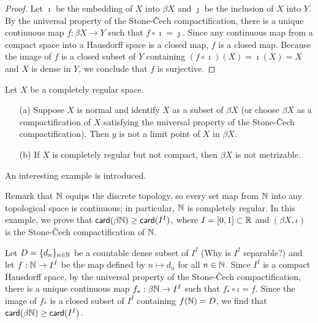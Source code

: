 \begin{proof}
    Let $\imath$ be the embedding of $X$ into $\beta X$ and $\jmath$ be the inclusion of $X$ into $Y$.
    By the universal property of the Stone-\v{C}ech compactification, there is a unique continuous map $f: \beta X\rightarrow Y$ such that $f\circ\imath=\jmath$.
    Since any continuous map from a compact space into a Hausdorff space is a closed map, $f$ is a closed map.
    Because the image of $f$ is a closed subset of $Y$ containing $(f\circ\imath)(X)=\imath(X)=X$ and $X$ is dense in $Y$, we conclude that $f$ is surjective.
\end{proof}
\color{red}
\begin{prop}
    Let $X$ be a completely regular space.
    \begin{enumerate}
        \item[(a)]
        {
            Suppose $X$ is normal and identify $X$ as a subset of $\beta X$ (or choose $\beta X$ as a compactification of $X$ satisfying the universal property of the Stone-\v{C}ech compactification).
            Then $y$ is not a limit point of $X$ in $\beta X$.
        }
        \item[(b)]
        {
            If $X$ is completely regular but not compact, then $\beta X$ is not metrizable.
        }
    \end{enumerate}
\end{prop}
\color{black}

An interesting example is introduced.
\begin{exmp}
    Remark that ${\mathbb{N}}$ equips the discrete topology, so every set map from ${\mathbb{N}}$ into any topological space is continuous; in particular, ${\mathbb{N}}$ is completely regular.
    In this example, we prove that $\textsf{card}({\beta{\mathbb{N}}})\geq\textsf{card}({I^I})$, where $I=[0, 1]\subset{\mathbb{R}}$ and $(\beta X, \iota)$ is the Stone-\v{C}ech compactification of ${\mathbb{N}}$.
    
    Let $D=\{d_n\}_{n\in{\mathbb{N}}}$ be a countable dense subset of $I^I$ \color{brown}(Why is $I^I$ separable?) \color{black} and let $f: {\mathbb{N}}\rightarrow I^I$ be the map defined by $n\mapsto d_n$ for all $n\in{\mathbb{N}}$.
    Since $I^I$ is a compact Hausdorff space, by the universal property of the Stone-\v{C}ech compactification, there is a unique continuous map $f_*: \beta{\mathbb{N}}\rightarrow I^I$ such that $f_*\circ\iota=f$.
    Since the image of $f_*$ is a closed subset of $I^I$ containing $f({\mathbb{N}})=D$, we find that $\textsf{card}({\beta{\mathbb{N}}})\geq\textsf{card}({I^I})$.
\end{exmp}

